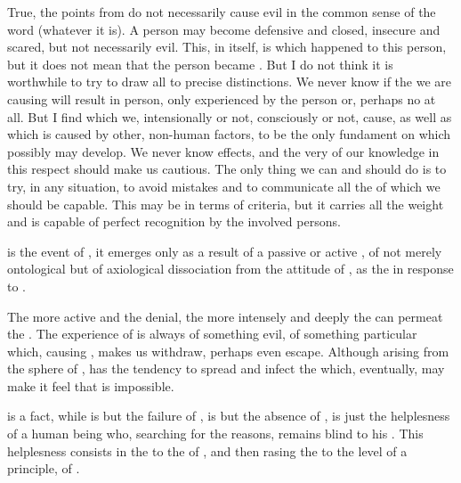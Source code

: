 {\pa True, the points from  do not necessarily
cause evil in the common sense of the word (whatever it is).  A person
may become defensive and closed, insecure and scared, but not
necessarily evil.  This, in itself, is  which happened to
this person, but it does not mean that the person became . 
But I do not think it is worthwhile to try to draw all to precise
distinctions.  We never know if the  we are causing will
result in  person, only  experienced by the person
or, perhaps no  at all.  But I find  which we,
intensionally or not, consciously or not, cause, as well as 
which is caused by other, non-human factors, to be the only fundament
on which  possibly may develop.  We never know 
effects, and the very  of our knowledge in this
respect should make us cautious.  The only thing we can and should do
is to try, in any  situation, to avoid mistakes and to
communicate all the  of which we should be capable.  This may
be  in terms of  criteria, but it carries all
the weight and is capable of perfect recognition by the involved
persons.



\pa {} is the event of , it emerges only as a
result of a passive or active \No, of not merely ontological
 but of axiological dissociation from the attitude of
, as the  in response to .

The more 
active and  the denial, the more intensely and deeply 
the  can permeat the . The experience of  is always 
 of something evil, of something particular which, 
causing , makes us withdraw, perhaps even escape. Although 
arising from the sphere of ,  has the tendency 
to spread and infect the  which, eventually, may make it feel 
that  is impossible. 


\pa
{} is a fact, while  is but the failure of
, is but the absence of , is just the
helplesness of a human being who, searching for the 
reasons, remains blind to his .  
This helplesness consists
in the  to the  of , and then
rasing the  to the level of a principle, of .

}
